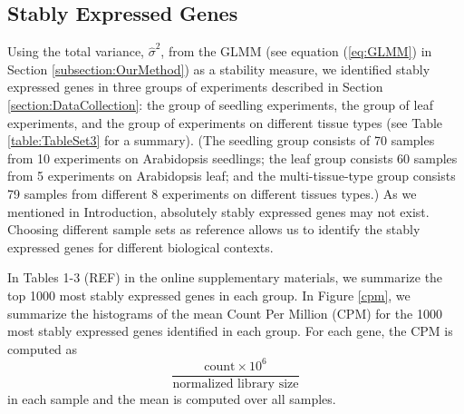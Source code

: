 \documentclass[11pt, a4paper]{article}
\begin{document}
\subsection{Stably Expressed Genes}\label{section:stablyExpressedGene}
Using the total variance, $\hat\sigma^2$, from the GLMM (see
equation (\ref{eq:GLMM}) in Section \ref{subsection:OurMethod}) as a
stability measure, we identified stably expressed genes in three groups of
experiments described in Section \ref{section:DataCollection}: the group of seedling
experiments, the group of leaf experiments, and the group of experiments on
different tissue types (see Table \ref{table:TableSet3} for a summary).  (The
seedling group consists of 70 samples from 10 experiments on Arabidopsis
seedlings; the leaf group consists 60 samples from 5 experiments on
Arabidopsis leaf; and the multi-tissue-type group consists 79 samples from
different 8 experiments on different tissues types.) As we mentioned in
Introduction, absolutely stably expressed genes may not exist.  Choosing
different sample sets as reference allows us to identify the stably expressed
genes for different biological contexts.

In Tables 1-3 (REF) in the online supplementary materials, we summarize the
top 1000 most stably expressed genes in each group.  In Figure \ref{cpm}, we
summarize the histograms of the mean Count Per Million (CPM) for the 1000
most stably expressed genes identified in each group. For each gene, the CPM
is computed as
\begin{equation}\label{eq:cpm}
 \dfrac{ \text{count} \times 10^6 }{ \text{normalized library size}} 
\end{equation}
in each sample and the mean is computed over all samples.
 
\end{document}
